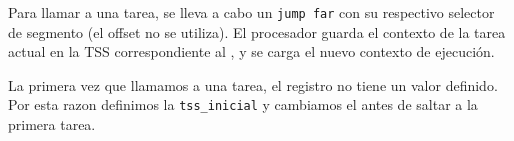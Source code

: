 Para llamar a una tarea, se lleva a cabo un \texttt{jump far} con su respectivo selector de segmento (el offset no se utiliza). El procesador guarda el contexto de la tarea actual en la TSS correspondiente al , y se carga el nuevo contexto de ejecución. 

La primera vez que llamamos a una tarea, el registro  no tiene un valor definido. Por esta razon definimos la \texttt{tss\_inicial} y cambiamos el  antes de saltar a la primera tarea.